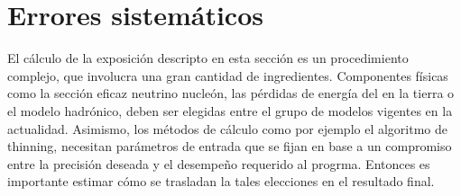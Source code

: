 	
%	
% 
% 
	
\section{Errores sistem\'aticos}
\label{sc:systErr}

El cálculo de la exposición descripto en esta secci\'on es un procedimiento complejo, que involucra una gran cantidad de ingredientes. 
Componentes f\'isicas como la sección eficaz neutrino nucleón, las pérdidas de energía del \tauon{} en la tierra o el modelo hadrónico, deben ser elegidas entre el grupo de modelos vigentes en la actualidad.
Asimismo, los m\'etodos de c\'alculo como por ejemplo el algoritmo de thinning, necesitan par\'ametros de entrada que se fijan en base a un compromiso entre la precisi\'on deseada y el desempe\~no requerido al progrma.
Entonces es importante estimar c\'omo se trasladan la tales elecciones en el resultado final.

